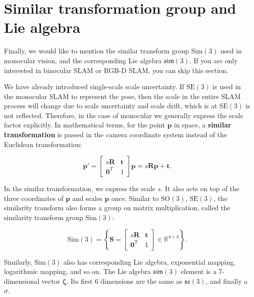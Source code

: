 \section{\textsuperscript{\ttfamily *} Similar transformation group and Lie algebra}

Finally, we would like to mention the similar transform group $\mathrm{Sim}(3)$ used in monocular vision, and the corresponding Lie algebra $\mathfrak{sim}(3)$. If you are only interested in binocular SLAM or RGB-D SLAM, you can skip this section.

We have already introduced single-scale scale uncertainty. If $\mathrm{SE}(3)$ is used in the monocular SLAM to represent the pose, then the scale in the entire SLAM process will change due to scale uncertainty and scale drift, which is at $\mathrm{SE}( 3) $ is not reflected. Therefore, in the case of monocular we generally express the scale factor explicitly. In mathematical terms, for the point $\bm{p}$ in space, a \textbf{similar transformation} is passed in the camera coordinate system instead of the Euclidean transformation:

\begin{equation}\label{key}
\bm{p}' = \left[ {\begin{array}{*{20}{c}}
	{s\bm{R}}&\bm{t}\\
	{{\bm{0}^\mathrm{T}}}&1
	\end{array}} \right] \bm{p}
	= s\bm{R} \bm{p} + \bm{t}.
\end{equation}

In the similar transformation, we express the scale $s$. It also acts on top of the three coordinates of $\bm{p}$ and scales $\bm{p}$ once. Similar to $\mathrm{SO}(3)$, $\mathrm{SE}(3)$, the similarity transform also forms a group on matrix multiplication, called the similarity transform group $\mathrm{Sim}(3)$:

\begin{equation}\label{key}
\mathrm{Sim}(3) = \left\{ { \bm{S} = \left[ {\begin{array}{*{20}{c}}
		{s\bm{R}}& \bm{t}\\
		{{\bm{0}^\mathrm{T}}}&1
		\end{array}} \right] \in {\mathbb{R}^{4 \times 4}}} \right\}.
\end{equation}

Similarly, $\mathrm{Sim}(3)$ also has corresponding Lie algebra, exponential mapping, logarithmic mapping, and so on. The Lie algebra $\mathfrak{sim}(3)$ element is a 7-dimensional vector $\boldsymbol{\zeta}$. Its first 6 dimensions are the same as $\mathfrak{se}(3)$, and finally a $\sigma$.

